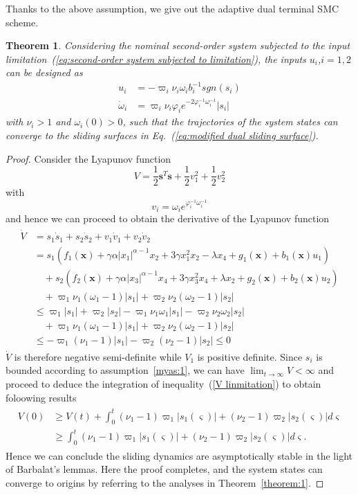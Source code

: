 \documentclass[3p]{elsarticle}
\theoremstyle{plain}
\newtheorem{mythm}{Theorem}
\theoremstyle{remark}
\begin{document}
{Thanks to the above assumption, we give out the adaptive dual terminal SMC scheme.
\begin{mythm}\label{thm:4}
Considering the nominal second-order system subjected to the input limitation~(\ref{eq:second-order system subjected to limitation}), the inputs $u_i$,$i=1,2$ can be designed as
\begin{align}
  u_i &= -\varpi_i\nu_i\omega_i b_i^{-1}sgn(s_i)\\
  \dot\omega_i&= \varpi_i\nu_i\varphi_i e^{-2\varphi_i^{-1}\omega_i^{-1}}\vert s_i\vert
\end{align}
with $\nu_i>1$ and $\omega_i(0)>0$, such that the trajectories of the system states can converge to the sliding surfaces in Eq.~(\ref{eq:modified dual sliding surface}).
\end{mythm}
\begin{proof}
Consider the Lyapunov function
$$V=\frac{1}{2}\bm s^T\bm s+\frac{1}{2}v_1^2+\frac{1}{2}v_2^2$$
with
$$v_i = \omega_ie^{\varphi_i^{-1}\omega_i^{-1}}$$
and hence we can proceed to obtain the derivative of the Lyapunov function
\begin{align}\begin{split}
\dot V &=s_1\dot s_1+s_2\dot s_2+v_1\dot v_1+v_2\dot v_2\\
&=s_1(f_1(\bm x)+\gamma\alpha\vert x_1\vert^{\alpha-1}x_2+3\gamma x_1^2x_2-\lambda x_4+g_1(\bm x)+b_1(\bm x)u_1)\\
&\quad +s_2(f_2(\bm x)+\gamma\alpha\vert x_3\vert^{\alpha-1}x_4+3\gamma x_3^2x_4+\lambda x_2+g_2(\bm x)+b_2(\bm x)u_2)\\
&\quad+\varpi_1\nu_1(\omega_1-1)\vert s_1\vert+\varpi_2\nu_2(\omega_2-1)\vert s_2\vert\\
&\le \varpi_1\vert s_1\vert+\varpi_2\vert s_2\vert-\varpi_1\nu_1\omega_1\vert s_1\vert-\varpi_2\nu_2\omega_2\vert s_2\vert\\
&\quad + \varpi_1\nu_1(\omega_1-1)\vert s_1\vert+\varpi_2\nu_2(\omega_2-1)\vert s_2\vert\\
&\le -\varpi_1(\nu_1-1)\vert s_1\vert-\varpi_2(\nu_2-1)\vert s_2\vert\le 0
\end{split}\end{align}\label{V linmitation}
$\dot V$ is therefore negative semi-deﬁnite while $V_1$ is positive deﬁnite. Since  $s_i$ is bounded according to assumption~\ref{myas:1}, we can have $\lim_{t\to\infty}V<\infty$ and proceed to deduce the integration of inequality~(\ref{V linmitation}) to obtain foloowing results
\begin{align}\begin{split}
V(0)&\ge V(t)+\int_0^t(\nu_1-1)\varpi_1\vert s_1(\varsigma)\vert+(\nu_2-1)\varpi_2\vert s_2(\varsigma)\vert d\varsigma\\
&\ge\int_0^t(\nu_1-1)\varpi_1\vert s_1(\varsigma)\vert+(\nu_2-1)\varpi_2\vert s_2(\varsigma)\vert d\varsigma.
\end{split}\end{align}
Hence we can conclude the sliding dynamics are asymptotically stable in the light of Barbalat’s lemmas. Here the proof completes, and the system states can converge to origins by referring to the analyses in Theorem~\ref{theorem:1}.
\end{proof}
}
\end{document}
